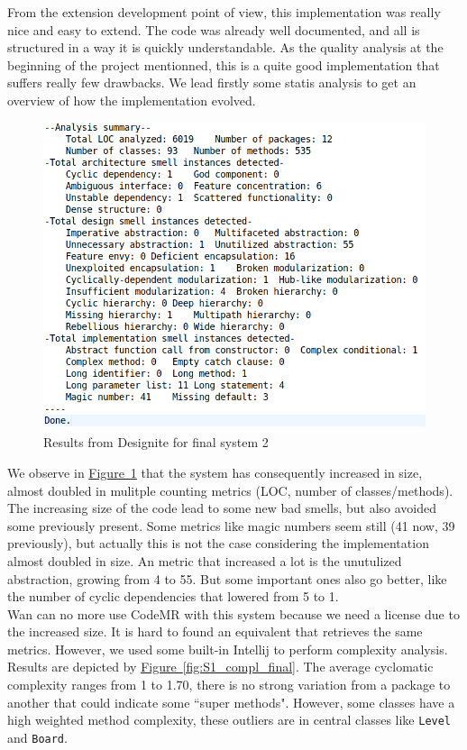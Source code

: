 \documentclass[]{article}
\newcommand{\wordlink}[2]{\hyperref[#2]{#1~\ref{#2}}}
\begin{document}
\indent From the extension development point of view, this implementation was really nice and easy to extend. The code was already well documented, and all is structured in a way it is quickly understandable. As the quality analysis at the beginning of the project mentionned, this is a quite good implementation that suffers really few drawbacks.
We lead firstly some statis analysis to get an overview of how the implementation evolved. 


\begin{figure}[h]
\centering
\includegraphics[width=0.7\linewidth]{S1-designite_final}
\caption{Results from Designite for final system 2}
\label{fig:S1_designite_final}
\end{figure}

\newpage

We observe in \wordlink{Figure}{fig:S1_designite_final} that the system has consequently increased in size, almost doubled in mulitple counting metrics (LOC, number of classes/methods). The increasing size of the code lead to some new bad smells, but also avoided some previously present. Some metrics like magic numbers seem still (41 now, 39 previously), but actually this is not the case considering the implementation almost doubled in size. An metric that increased a lot is the unutulized abstraction, growing from 4 to 55. But some important ones also go better, like the number of cyclic dependencies that lowered from 5 to 1.\\

Wan can no more use CodeMR with this system because we need a license due to the increased size. It is hard to found an equivalent that retrieves the same metrics. However, we used some built-in Intellij to perform complexity analysis. Results are depicted by \wordlink{Figure}{fig:S1_compl_final}. The average cyclomatic complexity ranges from 1 to 1.70, there is no strong variation from a package to another that could indicate some ``super methods". However, some classes have a high weighted method complexity, these outliers are in central classes like \texttt{Level} and \texttt{Board}.\\
\end{document}
